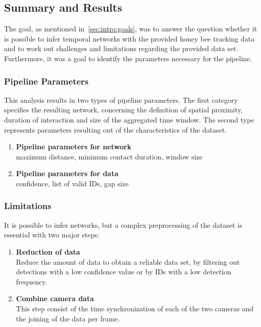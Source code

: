 \clearpage
\subsection{Summary and Results}
The goal, as mentioned in~\ref{sec:intro:goals}, was to answer the question whether it is possible to infer temporal networks with the provided honey bee tracking data and to work out challenges and limitations regarding the provided data set. Furthermore, it was a goal to identify the parameters necessary for the pipeline.

\subsubsection{Pipeline Parameters}
This analysis results in two types of pipeline parameters. The first category specifies the resulting network, concerning the definition of spatial proximity, duration of interaction and size of the aggregated time window. The second type represents parameters resulting out of the characteristics of the dataset.

\begin{enumerate}
\item \textbf{Pipeline parameters for network}\\
maximum distance, minimum contact duration, window size
\item \textbf{Pipeline parameters for data}\\
confidence, list of valid IDs, gap size
\end{enumerate}


\subsubsection{Limitations}
It is possible to infer networks, but a complex preprocessing of the dataset is essential with two major steps:

\begin{enumerate}
\item \textbf{Reduction of data}\\
Reduce the amount of data to obtain a reliable data set, by filtering out detections with a low confidence value or by IDs with a low detection frequency.
\item \textbf{Combine camera data}\\
This step consist of the time synchronization of each of the two cameras and the joining of the data per frame.
\end{enumerate}

